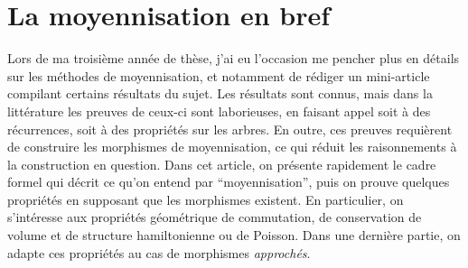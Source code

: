 
\clearemptydoublepage
\chapter{La moyennisation en bref}
\label{chap:avg}

Lors de ma troisième année de thèse, j'ai eu l'occasion me pencher plus
en détails sur les méthodes de moyennisation, et notamment de rédiger un
mini-article compilant certains résultats du sujet. Les résultats sont
connus, mais dans la littérature les preuves de ceux-ci sont
laborieuses, en faisant appel soit à des récurrences, soit à des
propriétés sur les arbres. En outre, ces preuves requièrent de
construire les morphismes de moyennisation, ce qui réduit les
raisonnements à la construction en question. Dans cet article, on
présente rapidement le cadre formel qui décrit ce qu'on entend par
\enquote{moyennisation}, puis on prouve quelques propriétés en supposant
que les morphismes existent. En particulier, on s'intéresse aux
propriétés géométrique de commutation, de conservation de volume et de
structure hamiltonienne ou de Poisson. Dans une dernière partie, on
adapte ces propriétés au cas de morphismes \textit{approchés}. 














